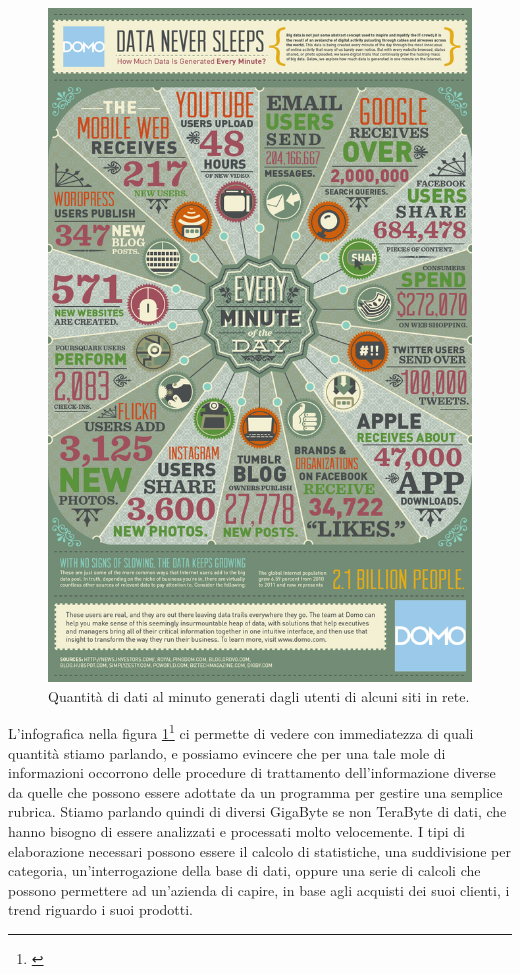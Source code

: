 \begin{figure}
	\centering
	\includegraphics[width=\textwidth]{img/Data-in-One-Minute.jpg}
	\caption{Quantità di dati al minuto generati dagli utenti di alcuni siti in rete.}
	\label{img:dpm}
\end{figure}
L'infografica nella figura \ref{img:dpm}\footnote{\cite{data_per_minute}} ci permette di vedere con immediatezza di quali quantità stiamo parlando, e possiamo evincere che per una tale mole di informazioni occorrono delle procedure di trattamento dell'informazione diverse da quelle che possono essere adottate da un programma per gestire una semplice rubrica. Stiamo parlando quindi di diversi GigaByte se non TeraByte di dati, che hanno bisogno di essere analizzati e processati molto velocemente. I tipi di elaborazione necessari possono essere il calcolo di statistiche, una suddivisione per categoria, un'interrogazione della base di dati, oppure una serie di calcoli che possono permettere ad un'azienda di capire, in base agli acquisti dei suoi clienti, i trend riguardo i suoi prodotti. 

